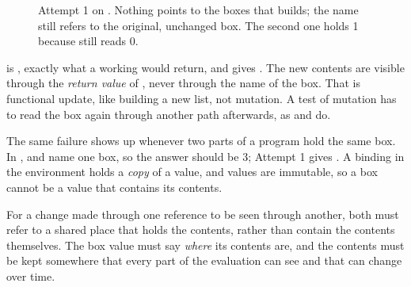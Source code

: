 \begin{figure}[htbp]
\centering
{}
\caption{Attempt 1 on . Nothing points to the boxes that  builds; the name  still refers to the original, unchanged box. The second one holds 1 because  still reads 0.}
\label{fig:attempt1}
\end{figure}

\begin{pitfall}
 is , exactly what a working  would return, and  gives . The new contents are visible through the \emph{return value} of , never through the name of the box. That is functional update, like  building a new list, not mutation. A test of mutation has to read the box again through another path afterwards, as  and  do.
\end{pitfall}

The same failure shows up whenever two parts of a program hold the same box. In ,  and  name one box, so the answer should be 3; Attempt 1 gives . A binding in the environment holds a \emph{copy} of a value, and values are immutable, so a box cannot be a value that contains its contents.

\begin{keypoint}
For a change made through one reference to be seen through another, both must refer to a shared place that holds the contents, rather than contain the contents themselves. The box value must say \emph{where} its contents are, and the contents must be kept somewhere that every part of the evaluation can see and that can change over time.
\end{keypoint}
